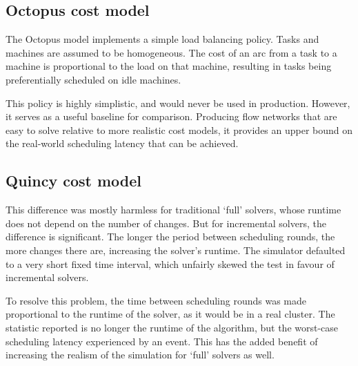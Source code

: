 
\subsection{Octopus cost model}

The Octopus model implements a simple load balancing policy. Tasks and machines are assumed to be homogeneous. The cost of an arc from a task to a machine is proportional to the load on that machine, resulting in tasks being preferentially scheduled on idle machines. 

This policy is highly simplistic, and would never be used in production. However, it serves as a useful baseline for comparison. Producing flow networks that are easy to solve relative to more realistic cost models, it provides an upper bound on the real-world scheduling latency that can be achieved.

\subsection{Quincy cost model}


This difference was mostly harmless for traditional `full' solvers, whose runtime does not depend on the number of changes.  But for incremental solvers, the difference is significant. The longer the period between scheduling rounds, the more changes there are, increasing the solver's runtime. The simulator defaulted to a very short fixed time interval, which unfairly skewed the test in favour of incremental solvers. 

To resolve this problem, the time between scheduling rounds was made proportional to the runtime of the solver, as it would be in a real cluster. The statistic reported is no longer the runtime of the algorithm, but the worst-case scheduling latency experienced by an event\footnotemark. This has the added benefit of increasing the realism of the simulation for `full' solvers as well.

